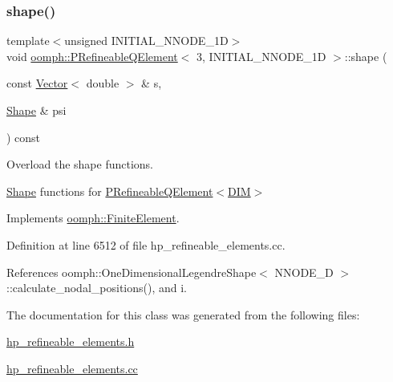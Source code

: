 \subsubsection{\texorpdfstring{shape()}{shape()}}
{\footnotesize\ttfamily template$<$unsigned I\+N\+I\+T\+I\+A\+L\+\_\+\+N\+N\+O\+D\+E\+\_\+1D$>$ \\
void \hyperlink{classoomph_1_1PRefineableQElement}{oomph\+::\+P\+Refineable\+Q\+Element}$<$ 3, I\+N\+I\+T\+I\+A\+L\+\_\+\+N\+N\+O\+D\+E\+\_\+1D $>$\+::shape (\begin{DoxyParamCaption}\item[{const \hyperlink{classoomph_1_1Vector}{Vector}$<$ double $>$ \&}]{s,  }\item[{\hyperlink{classoomph_1_1Shape}{Shape} \&}]{psi }\end{DoxyParamCaption}) const\hspace{0.3cm}{\ttfamily [virtual]}}



Overload the shape functions. 

\hyperlink{classoomph_1_1Shape}{Shape} functions for \hyperlink{classoomph_1_1PRefineableQElement}{P\+Refineable\+Q\+Element$<$\+D\+I\+M$>$} 

Implements \hyperlink{classoomph_1_1FiniteElement_a58a25b6859ddd43b7bfe64a19fee5023}{oomph\+::\+Finite\+Element}.



Definition at line 6512 of file hp\+\_\+refineable\+\_\+elements.\+cc.



References oomph\+::\+One\+Dimensional\+Legendre\+Shape$<$ N\+N\+O\+D\+E\+\_\+D $>$\+::calculate\+\_\+nodal\+\_\+positions(), and i.



The documentation for this class was generated from the following files\+:\begin{DoxyCompactItemize}
\item 
\hyperlink{hp__refineable__elements_8h}{hp\+\_\+refineable\+\_\+elements.\+h}\item 
\hyperlink{hp__refineable__elements_8cc}{hp\+\_\+refineable\+\_\+elements.\+cc}\end{DoxyCompactItemize}
